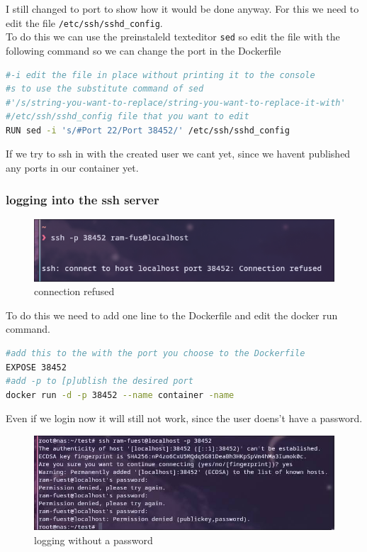 \documentclass[a4paper]{article}
\begin{document}
I still changed to port to show how it would be done anyway.
For this we need to edit the file \texttt{/etc/ssh/sshd\_config}. \\
To do this we can use the preinstaleld texteditor \texttt{sed} so edit the file with the following command so we can change the port in the Dockerfile
\begin{lstlisting}[language=bash]
#-i edit the file in place without printing it to the console
#s to use the substitute command of sed
#'/s/string-you-want-to-replace/string-you-want-to-replace-it-with'
#/etc/ssh/sshd_config file that you want to edit
RUN sed -i 's/#Port 22/Port 38452/' /etc/ssh/sshd_config
\end{lstlisting}
If we try to ssh in with the created user we cant yet, since we havent published any ports in our container yet.
\subsubsection{logging into the ssh server}
\begin{figure}[h]
	\centering
	\includegraphics[scale=0.4]{images/loggingin-before-expsing-the-port.png}
	\caption{connection refused}
\end{figure} 
To do this we need to add one line to the Dockerfile and edit the docker run command.
\begin{lstlisting}[language=bash]
#add this to the with the port you choose to the Dockerfile
EXPOSE 38452
#add -p to [p]ublish the desired port
docker run -d -p 38452 --name container -name
\end{lstlisting}
Even if we login now it will still not work, since the user doens't have a password.
\begin{figure}[h]
	\centering
	\includegraphics[scale=0.4]{images/failingtologin.png}
	\caption{logging without a password}
\end{figure} \\
\end{document}
